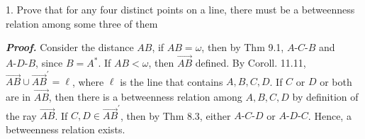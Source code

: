 \documentclass{report}
\begin{document}
    \pagebreak 
    \bigbreak \noindent 
    \begin{mdframed}
        1. Prove that for any four distinct points on a line, there must be a betweenness relation among some three of them
    \end{mdframed}
    \bigbreak \noindent 
    \textbf{\textit{Proof.}} Consider the distance $AB$, if $AB = \omega$, then by Thm 9.1, $ A\text{-}C\text{-}B$ and $ A\text{-}D\text{-}B$, since $B = A^{*}$. 
    \bigbreak \noindent 
    If $AB < \omega$, then $\overrightarrow{AB}$ defined. By Coroll. 11.11, $\overrightarrow{AB} \cup \overrightarrow{AB}^{\prime}  = \ell$, where $\ell$ is the line that contains $A,B,C,D$. If $C$ or $D$ or both are in $\overrightarrow{AB}$, then there is a betweenness relation among $A,B,C,D$ by definition of the ray $\overrightarrow{AB}$. If $C,D \in \overrightarrow{AB}^{\prime}$, then by Thm 8.3, either $  A\text{-}C\text{-}D$ or $ A\text{-}D\text{-}C$. Hence, a betweenness relation exists.


\end{document}
